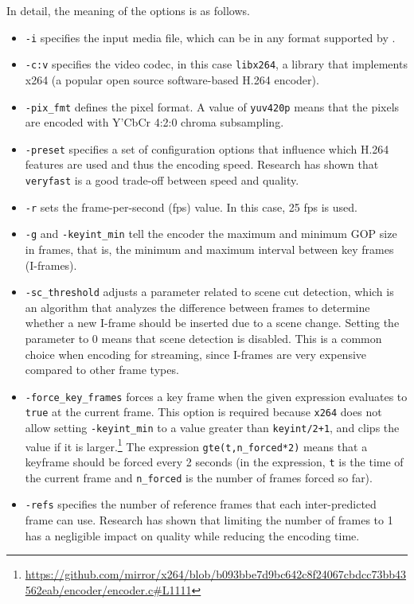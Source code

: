 In detail, the meaning of the options is as follows.

\begin{itemize}
    \item \texttt{-i} specifies the input media file, which can be in any format supported by \ffmpeg{}.
    \item \texttt{-c:v} specifies the video codec, in this case \texttt{libx264}, a library that implements x264 (a popular open source software-based H.264 encoder).
    \item \texttt{-pix\_fmt} defines the pixel format. A value of \texttt{yuv420p} means that the pixels are encoded with Y'CbCr 4:2:0 chroma subsampling.
    \item \texttt{-preset} specifies a set of configuration options that influence which H.264 features are used and thus the encoding speed. Research has shown that \texttt{veryfast} is a good trade-off between speed and quality.\cite{ozer}
    \item \texttt{-r} sets the frame-per-second (fps) value. In this case, 25 fps is used.
    \item \texttt{-g} and \texttt{-keyint\_min} tell the encoder the maximum and minimum GOP size in frames, that is, the minimum and maximum interval between key frames (I-frames).
    \item \texttt{-sc\_threshold} adjusts a parameter related to scene cut detection, which is an algorithm that analyzes the difference between frames to determine whether a new I-frame should be inserted due to a scene change. Setting the parameter to 0 means that scene detection is disabled. This is a common choice when encoding for streaming, since I-frames are very expensive compared to other frame types.\cite{ozer}
    \item \texttt{-force\_key\_frames} forces a key frame when the given expression evaluates to \texttt{true} at the current frame. This option is required because \texttt{x264} does not allow setting \texttt{-keyint\_min} to a value greater than \texttt{keyint/2+1}, and clips the value if it is larger.\footnote{\url{https://github.com/mirror/x264/blob/b093bbe7d9bc642c8f24067cbdcc73bb43562eab/encoder/encoder.c\#L1111}} The expression \texttt{gte(t,n\_forced*2)} means that a keyframe should be forced every 2 seconds (in the expression, \texttt{t} is the time of the current frame and \texttt{n\_forced} is the number of frames forced so far).
    \item \texttt{-refs} specifies the number of reference frames that each inter-predicted frame can use. Research has shown that limiting the number of frames to 1 has a negligible impact on quality while reducing the encoding time.\cite{ozer}

\end{itemize}
